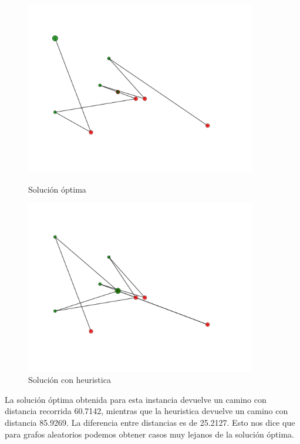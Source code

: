 \begin{figure}[H]
\centering
\begin{minipage}{0.45\textwidth}
\centering
\includegraphics[width=0.9\textwidth]{imagenes/test4-soltest4BT.pdf}
\caption{Solución óptima}
\label{fig:ej2_caso4bt}
\end{minipage}
\qquad
\begin{minipage}{0.45\textwidth}
\centering
\includegraphics[width=0.9\textwidth]{imagenes/test4-soltest4H.pdf}
\caption{Solución con heuristica}
\label{fig:ej2_caso4h}
\end{minipage}
\end{figure}

La solución óptima obtenida para esta instancia devuelve un camino con distancia recorrida 60.7142, mientras que la heuristica devuelve un camino con distancia 85.9269. La diferencia entre distancias es de 25.2127. Esto nos dice que para grafos aleatorios podemos obtener casos muy lejanos de la solución óptima.


